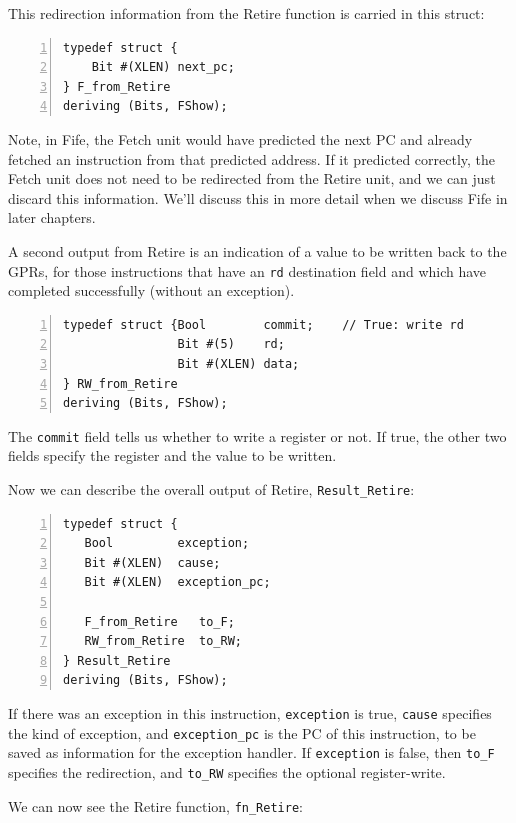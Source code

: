 This redirection information from the Retire function is carried in
this struct:

{\small
\begin{Verbatim}[frame=single, numbers=left]
typedef struct {
    Bit #(XLEN) next_pc;
} F_from_Retire
deriving (Bits, FShow);
\end{Verbatim}
}

Note, in Fife, the Fetch unit would have predicted the next PC and
already fetched an instruction from that predicted address.  If it
predicted correctly, the Fetch unit does not need to be redirected
from the Retire unit, and we can just discard this information.  We'll
discuss this in more detail when we discuss Fife in later chapters.

A second output from Retire is an indication of a value to be written
back to the GPRs, for those instructions that have an \verb|rd|
destination field and which have completed successfully (without an
exception).

{\small
\begin{Verbatim}[frame=single, numbers=left]
typedef struct {Bool        commit;    // True: write rd
                Bit #(5)    rd;
                Bit #(XLEN) data;
} RW_from_Retire
deriving (Bits, FShow);
\end{Verbatim}
}

The \verb|commit| field tells us whether to write a register or not.
If true, the other two fields specify the register and the value to be
written.

Now we can describe the overall output of Retire, \verb|Result_Retire|:

{\small
\begin{Verbatim}[frame=single, numbers=left]
typedef struct {
   Bool         exception;
   Bit #(XLEN)  cause;
   Bit #(XLEN)  exception_pc;

   F_from_Retire   to_F;
   RW_from_Retire  to_RW;
} Result_Retire
deriving (Bits, FShow);
\end{Verbatim}
}

If there was an exception in this instruction, \verb|exception| is
true, \verb|cause| specifies the kind of exception, and
\verb|exception_pc| is the PC of this instruction, to be saved as
information for the exception handler.  If \verb|exception| is false,
then \verb|to_F| specifies the redirection, and \verb|to_RW| specifies
the optional register-write.

We can now see the Retire function, \verb|fn_Retire|:

